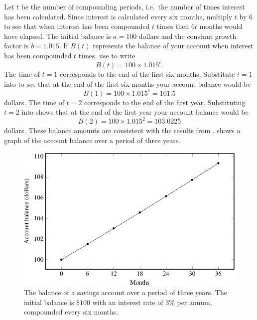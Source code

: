 \documentclass[a4paper,oneside,12pt]{article}
\begin{document}
\begin{solution}
Let $t$ be the number of compounding periods, i.e.~the number of times
interest has been calculated.  Since interest is calculated every six
months, multiply $t$ by $6$ to see that when interest has been
compounded $t$ times then $6t$ months would have elapsed.  The initial
balance is $a = 100$ dollars and the constant growth factor is
$b = 1.015$.  If $B(t)$ represents the balance of your account when
interest has been compounded $t$ times, use
 to write
\begin{equation}
\label{eqn:exponential:compound_interest_a100_b1.015}
B(t)
=
100 \times 1.015^t.
\end{equation}
The time of $t = 1$ corresponds to the end of the first six months.
Substitute $t = 1$ into
 to see that
at the end of the first six months your account balance would be
\[
B(1)
=
100 \times 1.015^1
=
101.5
\]
dollars.  The time of $t = 2$ corresponds to the end of the first
year.  Substituting $t = 2$ into
 shows that at
the end of the first year your account balance would be
\[
B(2)
=
100 \times 1.015^2
=
103.0225
\]
dollars.  These balance amounts are consistent with the results
from .
 shows a graph
of the account balance over a period of three years.

\begin{figure}[!htbp]
\centering
\includegraphics[scale=1.1]{image/11/interest-half-yearly.pdf}
\caption{%
  The balance of a savings account over a period of three years.  The
  initial balance is $\$100$ with an interest rate of $3\%$ per annum,
  compounded every six months.
}
\label{fig:exponential:compound_interest_a100_b1.015}
\end{figure}


\end{solution}
\end{document}

